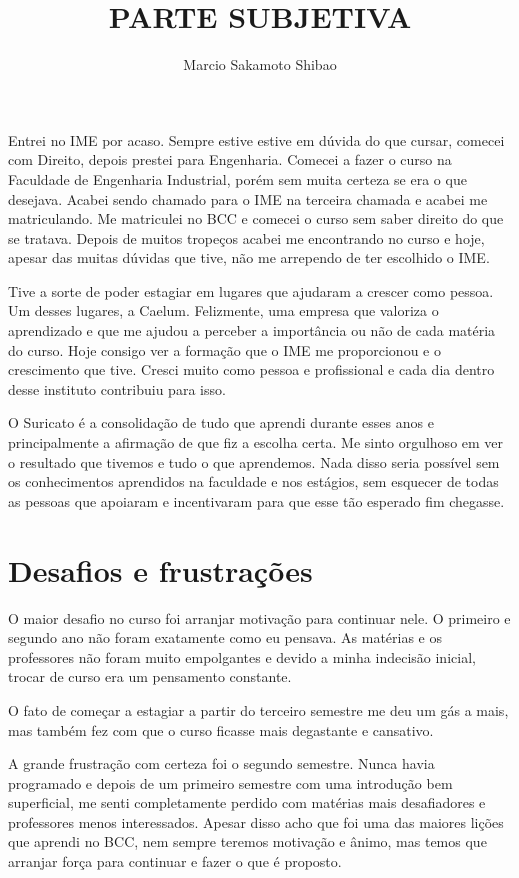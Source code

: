 \documentclass[titlepage,a4paper]{article}
\title{PARTE SUBJETIVA}
\author{Marcio Sakamoto Shibao}
\begin{document}
\maketitle
Entrei no IME por acaso. Sempre estive estive em dúvida do que cursar, comecei com Direito, depois prestei para Engenharia. Comecei a fazer o curso na Faculdade de Engenharia Industrial, porém sem muita certeza se era o que desejava. Acabei sendo chamado para o IME na terceira chamada e acabei me matriculando. Me matriculei no BCC e comecei o curso sem saber direito do que se tratava. Depois de muitos tropeços acabei me encontrando no curso e hoje, apesar das muitas dúvidas que tive, não me arrependo de ter escolhido o IME.

Tive a sorte de poder estagiar em lugares que ajudaram a crescer como pessoa. Um desses lugares, a Caelum. Felizmente, uma empresa que valoriza o aprendizado e que me ajudou a perceber a importância ou não de cada matéria do curso. Hoje consigo ver a formação que o IME me proporcionou e o crescimento que tive. Cresci muito como pessoa e profissional e cada dia dentro desse instituto contribuiu para isso.

O Suricato é a consolidação de tudo que aprendi durante esses anos e principalmente a afirmação de que fiz a escolha certa. Me sinto orgulhoso em ver o resultado que tivemos e tudo o que aprendemos. Nada disso seria possível sem os conhecimentos aprendidos na faculdade e nos estágios, sem esquecer de todas as pessoas que apoiaram e incentivaram para que esse tão esperado fim chegasse.
\section{Desafios e frustrações}

O maior desafio no curso foi arranjar motivação para continuar nele. O primeiro e segundo ano não foram exatamente como eu pensava. As matérias e os professores não foram muito empolgantes e devido a minha indecisão inicial, trocar de curso era um pensamento constante.

O fato de começar a estagiar a partir do terceiro semestre me deu um gás a mais, mas também fez com que o curso ficasse mais degastante e cansativo.

A grande frustração com certeza foi o segundo semestre. Nunca havia programado e depois de um primeiro semestre com uma introdução bem superficial, me senti completamente perdido com matérias mais desafiadores e professores menos interessados. Apesar disso acho que foi uma das maiores lições que aprendi no BCC, nem sempre teremos motivação e ânimo, mas temos que arranjar força para continuar e fazer o que é proposto.
\end{document}
